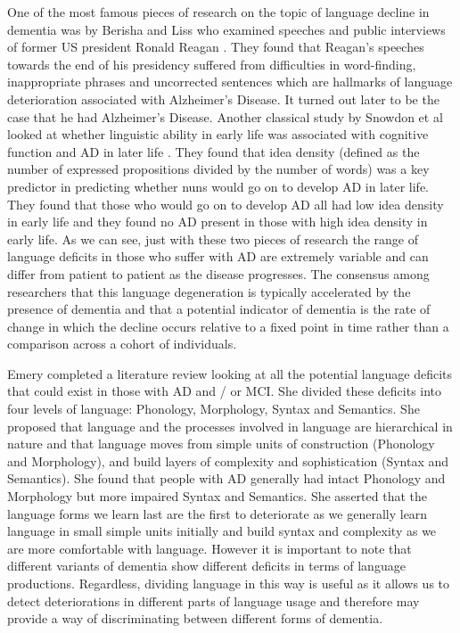 \par
One of the most famous pieces of research on the topic of language decline in dementia was by Berisha and Liss who examined speeches and public interviews of former US president Ronald Reagan \cite{Berisha2015}. They found that Reagan's speeches towards the end of his presidency suffered from difficulties in word-finding, inappropriate phrases and uncorrected sentences which are hallmarks of language deterioration associated with Alzheimer's Disease. It turned out later to be the case that he had Alzheimer's Disease. Another classical study by Snowdon et al looked at whether linguistic ability in early life was associated with cognitive function and AD in later life \cite{Snowdon1996} . They found that idea density (defined as the number of expressed propositions divided by the number of words) was a key predictor in predicting whether nuns would go on to develop AD in later life. They found that those who would go on to develop AD all had low idea density in early life and they found no AD present in those with high idea density in early life. As we can see, just with these two pieces of research the range of language deficits in those who suffer with AD are extremely variable and can differ from patient to patient as the disease progresses. The consensus among researchers that this language degeneration is typically accelerated by the presence of dementia \cite{Berisha2015} and that a potential indicator of dementia is the rate of change in which the decline occurs relative to a fixed point in time rather than a comparison across a cohort of individuals. 
\par
Emery \cite{Emery2000} completed a literature review looking at all the potential language deficits that could exist in those with AD and / or MCI. She divided these deficits into four levels of language: Phonology, Morphology, Syntax and Semantics. She proposed that language and the processes involved in language are hierarchical in nature and that language moves from simple units of construction (Phonology and Morphology), and build layers of complexity and sophistication (Syntax and Semantics). She found that people with AD generally had intact Phonology and Morphology but more impaired Syntax and Semantics. She asserted that the language forms we learn last are the first to deteriorate as we generally learn language in small simple units initially and build syntax and complexity as we are more comfortable with language. However it is important to note that different variants of dementia show different deficits in terms of language productions. Regardless, dividing language in this way is useful as it allows us to detect deteriorations in different parts of language usage and therefore may provide a way of discriminating between different forms of dementia. 
